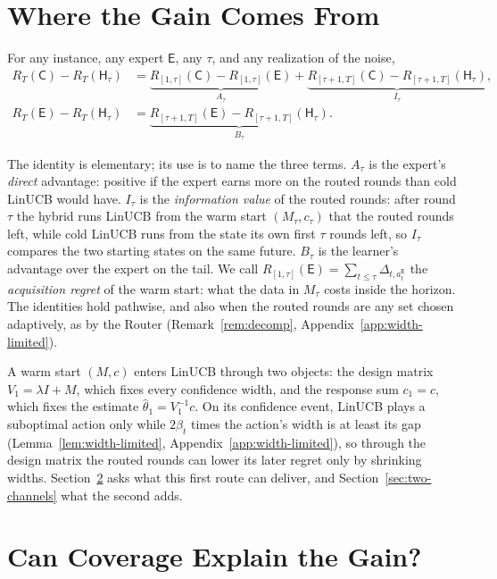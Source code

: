 \documentclass[anon]{alt2027} %
\newcommand{\Cold}{\mathsf{C}}
\newcommand{\Exp}{\mathsf{E}}
\newcommand{\Hyb}{\mathsf{H}}
\begin{document}
\section{Where the Gain Comes From}
\label{sec:decomp}

\begin{proposition}
\label{prop:decomp}
For any instance, any expert $\Exp$, any $\tau$, and any realization of the
noise,
\begin{align*}
R_T(\Cold)-R_T(\Hyb_\tau)
&=\underbrace{R_{[1,\tau]}(\Cold)-R_{[1,\tau]}(\Exp)}_{A_\tau}
 +\underbrace{R_{[\tau+1,T]}(\Cold)-R_{[\tau+1,T]}(\Hyb_\tau)}_{I_\tau},\\
R_T(\Exp)-R_T(\Hyb_\tau)
&=\underbrace{R_{[\tau+1,T]}(\Exp)-R_{[\tau+1,T]}(\Hyb_\tau)}_{B_\tau}.
\end{align*}
\end{proposition}

The identity is elementary; its use is to name the three terms. $A_\tau$ is
the expert's \emph{direct} advantage: positive if the expert earns more on
the routed rounds than cold LinUCB would have. $I_\tau$ is the
\emph{information value} of the routed rounds: after round $\tau$ the hybrid
runs LinUCB from the warm start $(M_\tau,c_\tau)$ that the routed rounds
left, while cold LinUCB runs from the state its own first $\tau$ rounds left,
so $I_\tau$ compares the two starting states on the same future. $B_\tau$ is
the learner's advantage over the expert on the tail. We call
$R_{[1,\tau]}(\Exp)=\sum_{t\le\tau}\Delta_{t,a_t^{\Exp}}$ the
\emph{acquisition regret} of the warm start: what the data in $M_\tau$ costs
inside the horizon. The identities hold pathwise, and also when the routed
rounds are any set chosen adaptively, as by the Router
(Remark~\ref{rem:decomp}, Appendix~\ref{app:width-limited}).

A warm start $(M,c)$ enters LinUCB through two objects: the design matrix
$V_1=\lambda I+M$, which fixes every confidence width, and the response sum
$c_1=c$, which fixes the estimate $\widehat\theta_1=V_1^{-1}c$. On its
confidence event, LinUCB plays a suboptimal action only while $2\beta_t$
times the action's width is at least its gap
(Lemma~\ref{lem:width-limited}, Appendix~\ref{app:width-limited}), so
through the design matrix the routed rounds can lower its later regret only
by shrinking widths. Section~\ref{sec:price} asks what this first route can
deliver, and Section~\ref{sec:two-channels} what the second adds.

\section{Can Coverage Explain the Gain?}
\label{sec:price}
\end{document}
